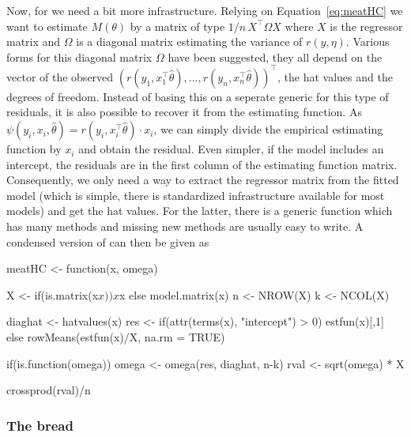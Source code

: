 \documentclass{Z}
\begin{document}
Now, for  we need a bit more infrastructure. Relying on Equation~\ref{eq:meatHC}
we want to estimate $M(\theta)$ by a matrix of type $1/n \, X^\top \Omega X$ where $X$
is the regressor matrix and $\Omega$ is a diagonal matrix estimating the variance of $r(y, \eta)$.
Various forms for this diagonal matrix $\Omega$ have been suggested, they all depend on
the vector of the observed $(r(y_1, x_1^\top \hat \theta), \dots, r(y_n, x_n^\top \hat \theta))^\top$,
the hat values and the degrees of freedom. Instead of basing this on a seperate generic
for this type of residuals, it is also possible to recover it from the estimating function.
As $\psi(y_i, x_i, \hat \theta) = r(y_i, x_i^\top \hat \theta) \cdot x_i$, we can simply 
divide the empirical estimating function by $x_i$ and obtain the residual. Even simpler,
if the model includes an intercept, the residuals are in the first column of the estimating
function matrix. Consequently, we only need a way to extract the regressor matrix from
the fitted model (which is simple, there is standardized infrastructure available for
most models) and get the hat values. For the latter, there is a generic function
 which has many methods and missing new methods are usually easy to
write. A condensed version of  can then be given as
\begin{Schunk}
\begin{Sinput}
meatHC <- function(x, omega)
{
  X <- if(is.matrix(x$x)) x$x else model.matrix(x)
  n <- NROW(X)
  k <- NCOL(X)

  diaghat <- hatvalues(x)
  res <- if(attr(terms(x), "intercept") > 0) estfun(x)[,1]
           else rowMeans(estfun(x)/X, na.rm = TRUE)
  
  if(is.function(omega)) omega <- omega(res, diaghat, n-k)
  rval <- sqrt(omega) * X
  
  crossprod(rval)/n
}
\end{Sinput}
\end{Schunk}


\subsubsection*{The bread}
\end{document}
